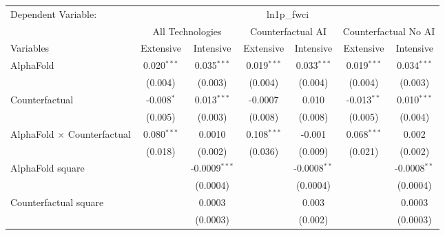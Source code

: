 \begingroup
\centering
\begin{tabular}{lcccccc}
   \tabularnewline \midrule \midrule
   Dependent Variable: & \multicolumn{6}{c}{ln1p\_fwci}\\
 & \multicolumn{2}{c}{All Technologies} & \multicolumn{2}{c}{Counterfactual AI} & \multicolumn{2}{c}{Counterfactual No AI} \\
\cmidrule(lr){1-1}\cmidrule(lr){2-3} \cmidrule(lr){4-5} \cmidrule(lr){6-7}
Variables & \multicolumn{1}{c}{Extensive} & \multicolumn{1}{c}{Intensive} & \multicolumn{1}{c}{Extensive} & \multicolumn{1}{c}{Intensive} & \multicolumn{1}{c}{Extensive} & \multicolumn{1}{c}{Intensive} \\
\cmidrule(lr){1-1}\cmidrule(lr){2-2} \cmidrule(lr){3-3} \cmidrule(lr){4-4} \cmidrule(lr){5-5} \cmidrule(lr){6-6} \cmidrule(lr){7-7}
   AlphaFold                          & 0.020$^{***}$ & 0.035$^{***}$   & 0.019$^{***}$ & 0.033$^{***}$  & 0.019$^{***}$ & 0.034$^{***}$\\   
                                      & (0.004)       & (0.003)         & (0.004)       & (0.004)        & (0.004)       & (0.003)\\   
   Counterfactual                     & -0.008$^{*}$  & 0.013$^{***}$   & -0.0007       & 0.010          & -0.013$^{**}$ & 0.010$^{***}$\\   
                                      & (0.005)       & (0.003)         & (0.008)       & (0.008)        & (0.005)       & (0.004)\\   
   AlphaFold $\times$ Counterfactual  & 0.080$^{***}$ & 0.0010          & 0.108$^{***}$ & -0.001         & 0.068$^{***}$ & 0.002\\   
                                      & (0.018)       & (0.002)         & (0.036)       & (0.009)        & (0.021)       & (0.002)\\   
   AlphaFold square                   &               & -0.0009$^{***}$ &               & -0.0008$^{**}$ &               & -0.0008$^{**}$\\   
                                      &               & (0.0004)        &               & (0.0004)       &               & (0.0004)\\   
   Counterfactual square              &               & 0.0003          &               & 0.003          &               & 0.0003\\   
                                      &               & (0.0003)        &               & (0.002)        &               & (0.0003)\\   

\end{tabular}
